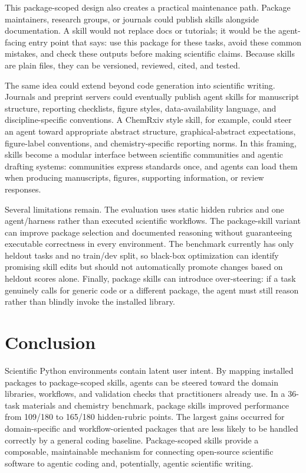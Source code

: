 \documentclass[11pt]{article}
\begin{document}
This package-scoped design also creates a practical maintenance path. Package maintainers, research groups, or journals could publish skills alongside documentation. A skill would not replace docs or tutorials; it would be the agent-facing entry point that says: use this package for these tasks, avoid these common mistakes, and check these outputs before making scientific claims. Because skills are plain files, they can be versioned, reviewed, cited, and tested.

The same idea could extend beyond code generation into scientific writing. Journals and preprint servers could eventually publish agent skills for manuscript structure, reporting checklists, figure styles, data-availability language, and discipline-specific conventions. A ChemRxiv style skill, for example, could steer an agent toward appropriate abstract structure, graphical-abstract expectations, figure-label conventions, and chemistry-specific reporting norms. In this framing, skills become a modular interface between scientific communities and agentic drafting systems: communities express standards once, and agents can load them when producing manuscripts, figures, supporting information, or review responses.

Several limitations remain. The evaluation uses static hidden rubrics and one agent/harness rather than executed scientific workflows. The package-skill variant can improve package selection and documented reasoning without guaranteeing executable correctness in every environment. The benchmark currently has only heldout tasks and no train/dev split, so black-box optimization can identify promising skill edits but should not automatically promote changes based on heldout scores alone. Finally, package skills can introduce over-steering: if a task genuinely calls for generic code or a different package, the agent must still reason rather than blindly invoke the installed library.

\section{Conclusion}

Scientific Python environments contain latent user intent. By mapping installed packages to package-scoped skills, agents can be steered toward the domain libraries, workflows, and validation checks that practitioners already use. In a 36-task materials and chemistry benchmark, package skills improved performance from 109/180 to 165/180 hidden-rubric points. The largest gains occurred for domain-specific and workflow-oriented packages that are less likely to be handled correctly by a general coding baseline. Package-scoped skills provide a composable, maintainable mechanism for connecting open-source scientific software to agentic coding and, potentially, agentic scientific writing.
\end{document}
